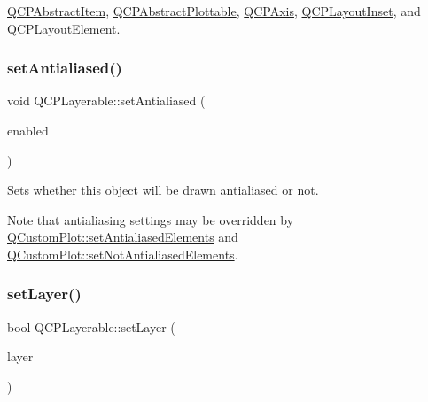 \hyperlink{classQCPAbstractItem_ae41d0349d68bb802c49104afd100ba2a}{Q\+C\+P\+Abstract\+Item}, \hyperlink{classQCPAbstractPlottable_addb3f5c41f007a78c3e142cc605bc712}{Q\+C\+P\+Abstract\+Plottable}, \hyperlink{classQCPAxis_a63b7103c57fe9acfbce164334ea837f8}{Q\+C\+P\+Axis}, \hyperlink{classQCPLayoutInset_a2eeef7ea1b8340e7c7c2e2fc229df5ea}{Q\+C\+P\+Layout\+Inset}, and \hyperlink{classQCPLayoutElement_ae97f483cccedadbf18ea4525ef240ee4}{Q\+C\+P\+Layout\+Element}.

\mbox{\label{classQCPLayerable_a4fd43e89be4a553ead41652565ff0581}} 
\subsubsection{\texorpdfstring{set\+Antialiased()}{setAntialiased()}}
{\footnotesize\ttfamily void Q\+C\+P\+Layerable\+::set\+Antialiased (\begin{DoxyParamCaption}\item[{bool}]{enabled }\end{DoxyParamCaption})}

Sets whether this object will be drawn antialiased or not.

Note that antialiasing settings may be overridden by \hyperlink{classQCustomPlot_af6f91e5eab1be85f67c556e98c3745e8}{Q\+Custom\+Plot\+::set\+Antialiased\+Elements} and \hyperlink{classQCustomPlot_ae10d685b5eabea2999fb8775ca173c24}{Q\+Custom\+Plot\+::set\+Not\+Antialiased\+Elements}. \mbox{\label{classQCPLayerable_ab0d0da6d2de45a118886d2c8e16d5a54}} 
\subsubsection{\texorpdfstring{set\+Layer()}{setLayer()}\hspace{0.1cm}{\footnotesize\ttfamily [1/2]}}
{\footnotesize\ttfamily bool Q\+C\+P\+Layerable\+::set\+Layer (\begin{DoxyParamCaption}\item[{\hyperlink{classQCPLayer}{Q\+C\+P\+Layer} $\ast$}]{layer }\end{DoxyParamCaption})}

